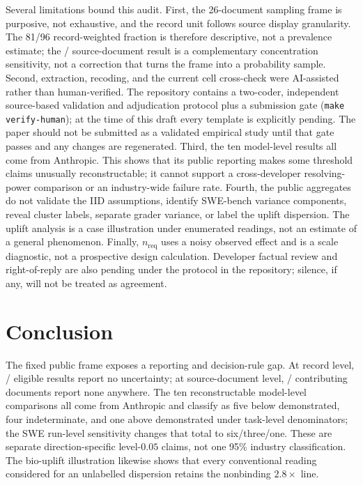 \documentclass{article}
\begin{document}
Several limitations bound this audit. First, the 26-document sampling frame is purposive,
not exhaustive, and the record unit follows source display granularity. The 81/96
record-weighted fraction is therefore descriptive, not a prevalence estimate; the
\CensusSourceNoUncertainty{}/\CensusSourceDocs{} source-document result is a complementary
concentration sensitivity, not a correction that turns the frame into a probability sample.
Second, extraction, recoding, and the current cell cross-check were AI-assisted rather than
human-verified. The repository contains a two-coder, independent source-based validation and
adjudication protocol plus a submission gate (\texttt{make verify-human}); at the time of
this draft every template is explicitly pending. The paper should not be submitted as a
validated empirical study until that gate passes and any changes are regenerated. Third,
the ten model-level results all come from Anthropic. This shows that its public reporting
makes some threshold claims unusually reconstructable; it cannot support a cross-developer
resolving-power comparison or an industry-wide failure rate. Fourth, the public aggregates
do not validate the IID assumptions, identify SWE-bench variance components, reveal cluster
labels, separate grader variance, or label the uplift dispersion. The uplift analysis is a
case illustration under enumerated readings, not an estimate of a general phenomenon.
Finally, $n_{\mathrm{req}}$ uses a noisy observed effect and is a scale diagnostic, not a
prospective design calculation. Developer factual review and right-of-reply are also
pending under the protocol in the repository; silence, if any, will not be treated as
agreement.



\section{Conclusion}
\label{sec:conclusion}

The fixed public frame exposes a reporting and decision-rule gap. At record level,
\CensusNoUncertainty{}/\CensusTotal{} eligible results report no uncertainty; at
source-document level, \CensusSourceNoUncertainty{}/\CensusSourceDocs{} contributing
documents report none anywhere. The ten reconstructable model-level comparisons all come
from Anthropic and classify as five below demonstrated, four indeterminate, and one above
demonstrated under task-level denominators; the SWE run-level sensitivity changes that total
to six/three/one. These are separate direction-specific level-$0.05$ claims, not one 95\%
industry classification. The bio-uplift illustration likewise shows that every conventional
reading considered for an unlabelled dispersion retains the nonbinding $2.8\times$ line.
\end{document}
